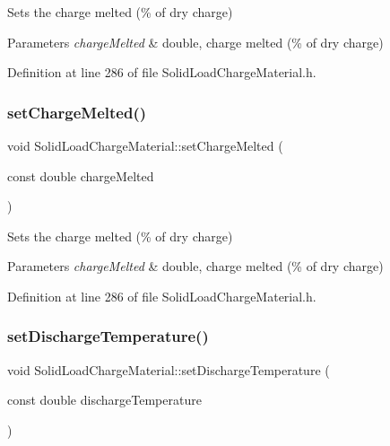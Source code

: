 Sets the charge melted (\% of dry charge) 
\begin{DoxyParams}{Parameters}
{\em charge\+Melted} & double, charge melted (\% of dry charge) \\
\hline
\end{DoxyParams}


Definition at line 286 of file Solid\+Load\+Charge\+Material.\+h.

\mbox{\label{class_solid_load_charge_material_a9999a2976e8a8662a86cc2a159df5202}} 
\subsubsection{\texorpdfstring{set\+Charge\+Melted()}{setChargeMelted()}\hspace{0.1cm}{\footnotesize\ttfamily [3/3]}}
{\footnotesize\ttfamily void Solid\+Load\+Charge\+Material\+::set\+Charge\+Melted (\begin{DoxyParamCaption}\item[{const double}]{charge\+Melted }\end{DoxyParamCaption})\hspace{0.3cm}{\ttfamily [inline]}}

Sets the charge melted (\% of dry charge) 
\begin{DoxyParams}{Parameters}
{\em charge\+Melted} & double, charge melted (\% of dry charge) \\
\hline
\end{DoxyParams}


Definition at line 286 of file Solid\+Load\+Charge\+Material.\+h.

\mbox{\label{class_solid_load_charge_material_adf73bc8d656a501cae5ad68af7a7c4fb}} 
\subsubsection{\texorpdfstring{set\+Discharge\+Temperature()}{setDischargeTemperature()}\hspace{0.1cm}{\footnotesize\ttfamily [1/3]}}
{\footnotesize\ttfamily void Solid\+Load\+Charge\+Material\+::set\+Discharge\+Temperature (\begin{DoxyParamCaption}\item[{const double}]{discharge\+Temperature }\end{DoxyParamCaption})\hspace{0.3cm}{\ttfamily [inline]}}

